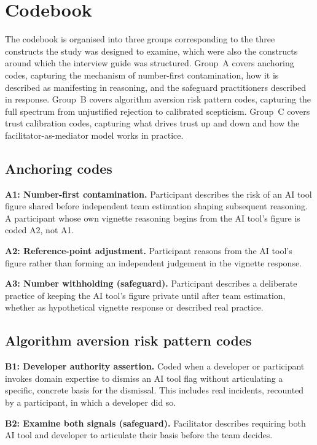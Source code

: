 \documentclass[a4paper,twoside]{bth}
\begin{document}
\chapter{Codebook}
\label{app:codebook}

The codebook is organised into three groups corresponding to the three constructs the study was designed to examine, which were also the constructs around which the interview guide was structured. Group~A covers anchoring codes, capturing the mechanism of number-first contamination, how it is described as manifesting in reasoning, and the safeguard practitioners described in response. Group~B covers algorithm aversion risk pattern codes, capturing the full spectrum from unjustified rejection to calibrated scepticism. Group~C covers trust calibration codes, capturing what drives trust up and down and how the facilitator-as-mediator model works in practice.

\section*{Anchoring codes}

\textbf{A1: Number-first contamination.} Participant describes the risk of an AI tool figure shared before independent team estimation shaping subsequent reasoning. A participant whose own vignette reasoning begins from the AI tool's figure is coded A2, not A1.

\textbf{A2: Reference-point adjustment.} Participant reasons from the AI tool's figure rather than forming an independent judgement in the vignette response.

\textbf{A3: Number withholding (safeguard).} Participant describes a deliberate practice of keeping the AI tool's figure private until after team estimation, whether as hypothetical vignette response or described real practice.

\section*{Algorithm aversion risk pattern codes}

\textbf{B1: Developer authority assertion.} Coded when a developer or participant invokes domain expertise to dismiss an AI tool flag without articulating a specific, concrete basis for the dismissal. This includes real incidents, recounted by a participant, in which a developer did so.

\textbf{B2: Examine both signals (safeguard).} Facilitator describes requiring both AI tool and developer to articulate their basis before the team decides.
\end{document}
